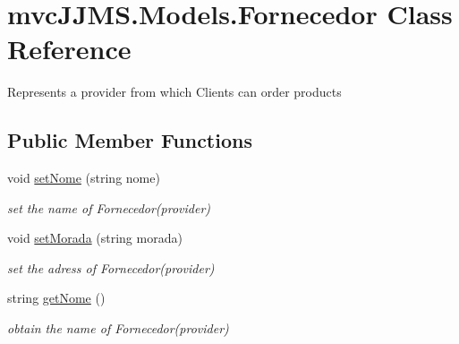 \hypertarget{classmvc_j_j_m_s_1_1_models_1_1_fornecedor}{}\section{mvc\+J\+J\+M\+S.\+Models.\+Fornecedor Class Reference}
\label{classmvc_j_j_m_s_1_1_models_1_1_fornecedor}


Represents a provider from which Clients can order products  


\subsection*{Public Member Functions}
\begin{DoxyCompactItemize}
\item 
void \mbox{\hyperlink{classmvc_j_j_m_s_1_1_models_1_1_fornecedor_a6197573e85fd7091904f00eda7444bc3}{set\+Nome}} (string nome)
\begin{DoxyCompactList}\small\item\em set the name of Fornecedor(provider) \end{DoxyCompactList}\item 
void \mbox{\hyperlink{classmvc_j_j_m_s_1_1_models_1_1_fornecedor_a8a3919c2983ee05ac36144ef604a9264}{set\+Morada}} (string morada)
\begin{DoxyCompactList}\small\item\em set the adress of Fornecedor(provider) \end{DoxyCompactList}\item 
string \mbox{\hyperlink{classmvc_j_j_m_s_1_1_models_1_1_fornecedor_adbbebab32a2d6ba5cb4f14c3089b9373}{get\+Nome}} ()
\begin{DoxyCompactList}\small\item\em obtain the name of Fornecedor(provider) \end{DoxyCompactList}\end{DoxyCompactItemize}
